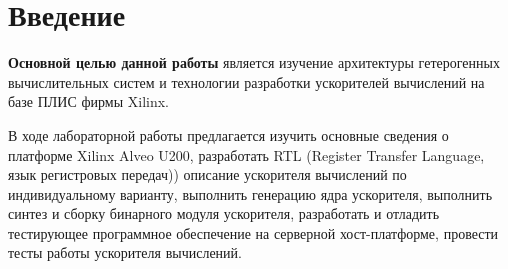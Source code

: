 \chapter*{Введение}

\textbf{Основной целью данной работы} является изучение архитектуры гетерогенных вычислительных систем и технологии разработки ускорителей вычислений на базе ПЛИС фирмы Xilinx.

В ходе лабораторной работы предлагается изучить основные сведения о платформе Xilinx Alveo U200, разработать RTL (Register Transfer Language, язык регистровых передач)) описание ускорителя вычислений по индивидуальному варианту, выполнить генерацию ядра ускорителя, выполнить синтез и сборку бинарного модуля ускорителя, разработать и отладить тестирующее программное обеспечение на серверной хост-платформе, провести тесты работы ускорителя вычислений.
